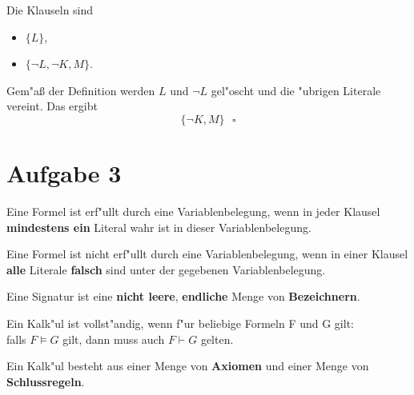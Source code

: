 \documentclass[10pt, oneside]{article}
\begin{document}
Die Klauseln sind
\begin{itemize}
    \item $\{L\}$,
    \item $\{\lnot L, \lnot K, M\}$.
\end{itemize}
Gem"a{\ss} der Definition werden $L$ und $\lnot L$ gel"oscht und die "ubrigen
Literale vereint. Das ergibt
\begin{equation*}
    \{\lnot K, M\} \ \ \ \square
\end{equation*}

\pagebreak
\section{Aufgabe 3}

Eine Formel ist erf"ullt durch eine Variablenbelegung, wenn in jeder Klausel
\textbf{mindestens ein} Literal wahr ist in dieser Variablenbelegung.

Eine Formel ist nicht erf"ullt durch eine Variablenbelegung, wenn in einer
Klausel \textbf{alle} Literale \textbf{falsch} sind unter der gegebenen
Variablenbelegung.

Eine Signatur ist eine \textbf{nicht leere}, \textbf{endliche} Menge von
\textbf{Bezeichnern}.

Ein Kalk"ul ist vollst"andig, wenn f"ur beliebige Formeln F und G gilt: \\
falls $F \models G$ gilt, dann muss auch $F \vdash G$ gelten.

Ein Kalk"ul besteht aus einer Menge von \textbf{Axiomen} und einer Menge von \textbf{Schlussregeln}.
\end{document}
